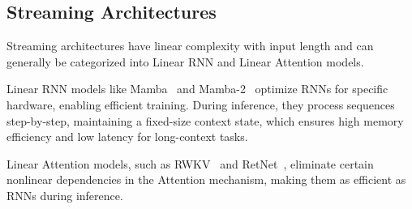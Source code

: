\subsection{Streaming Architectures}
Streaming architectures have linear complexity with input length and can generally be categorized into Linear RNN and Linear Attention models.

Linear RNN models like Mamba~\cite{gu2023mamba} and Mamba-2~\cite{daotransformers} optimize RNNs for specific hardware, enabling efficient training.
During inference, they process sequences step-by-step, maintaining a fixed-size context state, which ensures high memory efficiency and low latency for long-context tasks.

Linear Attention models, such as RWKV~\cite{peng2023rwkv} and RetNet~\cite{sun2023retentive}, eliminate certain nonlinear dependencies in the Attention mechanism, making them as efficient as RNNs during inference.
